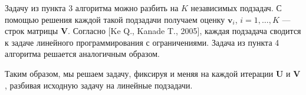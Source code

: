 \documentclass[10pt, ucs, notheorems, handout]{beamer}
\DeclareMathOperator*{\argminB}{argmin}   %
\begin{document}
\begin{frame}
{	Задачу из пункта 3 алгоритма можно разбить на $K$ независимых подзадач. С помощью решения каждой такой подзадачи получаем оценку $\mathbf{v}_i$, $i=1,\ldots,K$ --- строк матрицы $\mathbf{V}$. Согласно [Ke Q., Kanade T., 2005], каждая подзадача сводится к задаче линейного программирования с ограничениями. %
	Задача из пункта 4 алгоритма решается аналогичным образом.
	
	Таким образом, мы решаем задачу, фиксируя и меняя на каждой итерации $\mathbf{U}$ и $\mathbf{V}$, разбивая исходную задачу на линейные подзадачи.
}
\end{frame}

%
%	
%
\end{document}
